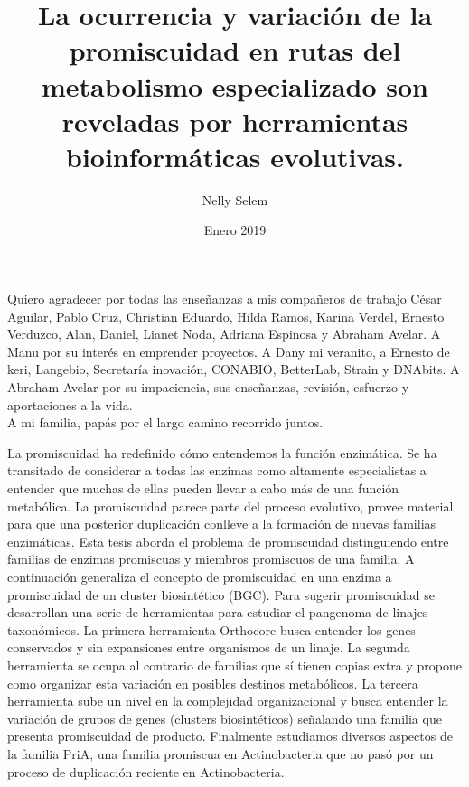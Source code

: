 \documentclass[12pt,twoside]{reedthesis}
\title{La ocurrencia y variación de la promiscuidad en rutas del metabolismo
especializado son reveladas por herramientas bioinformáticas evolutivas.}
\author{Nelly Selem}
\date{Enero 2019}
\begin{document}
      \maketitle
  
  \frontmatter %
  \pagestyle{empty} %

      \begin{acknowledgements}
      Quiero agradecer por todas las enseñanzas a mis compañeros de trabajo
      César Aguilar, Pablo Cruz, Christian Eduardo, Hilda Ramos, Karina
      Verdel, Ernesto Verduzco, Alan, Daniel, Lianet Noda, Adriana Espinosa y
      Abraham Avelar. A Manu por su interés en emprender proyectos. A Dany mi
      veranito, a Ernesto de keri, Langebio, Secretaría inovación, CONABIO,
      BetterLab, Strain y DNAbits. A Abraham Avelar por su impaciencia, sus
      enseñanzas, revisión, esfuerzo y aportaciones a la vida.\\
      A mi familia, papás por el largo camino recorrido juntos.
    \end{acknowledgements}
  
      \begin{preface}
      La promiscuidad ha redefinido cómo entendemos la función enzimática. Se
      ha transitado de considerar a todas las enzimas como altamente
      especialistas a entender que muchas de ellas pueden llevar a cabo más de
      una función metabólica. La promiscuidad parece parte del proceso
      evolutivo, provee material para que una posterior duplicación conlleve a
      la formación de nuevas familias enzimáticas. Esta tesis aborda el
      problema de promiscuidad distinguiendo entre familias de enzimas
      promiscuas y miembros promiscuos de una familia. A continuación
      generaliza el concepto de promiscuidad en una enzima a promiscuidad de
      un cluster biosintético (BGC). Para sugerir promiscuidad se desarrollan
      una serie de herramientas para estudiar el pangenoma de linajes
      taxonómicos. La primera herramienta Orthocore busca entender los genes
      conservados y sin expansiones entre organismos de un linaje. La segunda
      herramienta se ocupa al contrario de familias que sí tienen copias extra
      y propone como organizar esta variación en posibles destinos
      metabólicos. La tercera herramienta sube un nivel en la complejidad
      organizacional y busca entender la variación de grupos de genes
      (clusters biosintéticos) señalando una familia que presenta promiscuidad
      de producto. Finalmente estudiamos diversos aspectos de la familia PriA,
      una familia promiscua en Actinobacteria que no pasó por un proceso de
      duplicación reciente en Actinobacteria.
    \end{preface}
  
\end{document}
